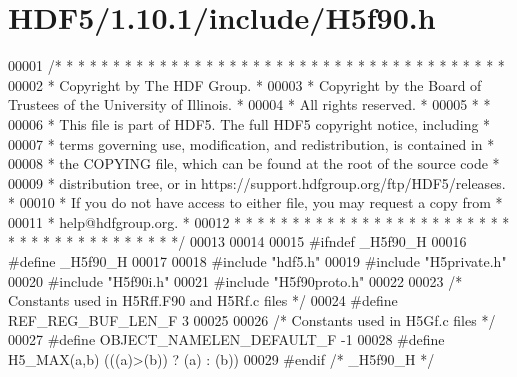 \hypertarget{_h_d_f5_21_810_81_2include_2_h5f90_8h_source}{}\section{H\+D\+F5/1.10.1/include/\+H5f90.h}
\label{_h_d_f5_21_810_81_2include_2_h5f90_8h_source}

\begin{DoxyCode}
00001 \textcolor{comment}{/* * * * * * * * * * * * * * * * * * * * * * * * * * * * * * * * * * * * * * *}
00002 \textcolor{comment}{ * Copyright by The HDF Group.                                               *}
00003 \textcolor{comment}{ * Copyright by the Board of Trustees of the University of Illinois.         *}
00004 \textcolor{comment}{ * All rights reserved.                                                      *}
00005 \textcolor{comment}{ *                                                                           *}
00006 \textcolor{comment}{ * This file is part of HDF5.  The full HDF5 copyright notice, including     *}
00007 \textcolor{comment}{ * terms governing use, modification, and redistribution, is contained in    *}
00008 \textcolor{comment}{ * the COPYING file, which can be found at the root of the source code       *}
00009 \textcolor{comment}{ * distribution tree, or in https://support.hdfgroup.org/ftp/HDF5/releases.  *}
00010 \textcolor{comment}{ * If you do not have access to either file, you may request a copy from     *}
00011 \textcolor{comment}{ * help@hdfgroup.org.                                                        *}
00012 \textcolor{comment}{ * * * * * * * * * * * * * * * * * * * * * * * * * * * * * * * * * * * * * * */}
00013 
00014 
00015 \textcolor{preprocessor}{#ifndef \_H5f90\_H}
00016 \textcolor{preprocessor}{#define \_H5f90\_H}
00017 
00018 \textcolor{preprocessor}{#include "hdf5.h"}
00019 \textcolor{preprocessor}{#include "H5private.h"}
00020 \textcolor{preprocessor}{#include "H5f90i.h"}
00021 \textcolor{preprocessor}{#include "H5f90proto.h"}
00022 
00023 \textcolor{comment}{/* Constants used in H5Rff.F90 and H5Rf.c files */}
00024 \textcolor{preprocessor}{#define REF\_REG\_BUF\_LEN\_F    3}
00025 
00026 \textcolor{comment}{/* Constants used in H5Gf.c files */}
00027 \textcolor{preprocessor}{#define OBJECT\_NAMELEN\_DEFAULT\_F -1}
00028 \textcolor{preprocessor}{#define H5\_MAX(a,b)            (((a)>(b)) ? (a) : (b))}
00029 \textcolor{preprocessor}{#endif }\textcolor{comment}{/* \_H5f90\_H */}\textcolor{preprocessor}{}
\end{DoxyCode}
